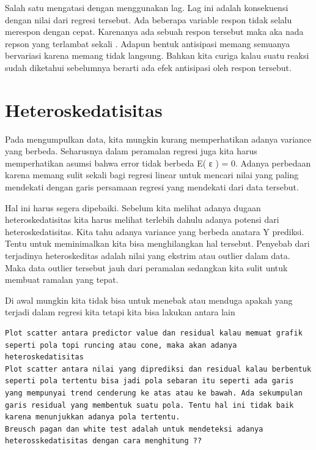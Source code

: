 \documentclass[
]{book}
\theoremstyle{definition}
\theoremstyle{definition}
\theoremstyle{definition}
\theoremstyle{definition}
\theoremstyle{remark}
\begin{document}
Salah satu mengatasi dengan menggunakan lag. Lag ini adalah konsekuensi dengan nilai dari regresi tersebut. Ada beberapa variable respon tidak selalu merespon dengan cepat. Karenanya ada sebuah respon tersebut maka aka nada repson yang terlambat sekali . Adapun bentuk antisipasi memang semuanya bervariasi karena memang tidak langsung. Bahkan kita curiga kalau suatu reaksi sudah diketahui sebelumnya berarti ada efek antisipasi oleh respon tersebut.

\hypertarget{heteroskedatisitas}{%
\section{Heteroskedatisitas}\label{heteroskedatisitas}}

Pada mengumpulkan data, kita mungkin kurang memperhatikan adanya variance yang berbeda. Seharusnya dalam peramalan regresi juga kita harus memperhatikan asumsi bahwa error tidak berbeda E( ε ) = 0. Adanya perbedaan karena memang sulit sekali bagi regresi linear untuk mencari nilai yang paling mendekati dengan garis persamaan regresi yang mendekati dari data tersebut.

Hal ini harus segera dipebaiki. Sebelum kita melihat adanya dugaan heteroskedatisitas kita harus melihat terlebih dahulu adanya potensi dari heteroskedatisitas. Kita tahu adanya variance yang berbeda anatara Y prediksi. Tentu untuk meminimalkan kita bisa menghilangkan hal tersebut. Penyebab dari terjadinya heteroskeditas adalah nilai yang ekstrim atau outlier dalam data. Maka data outlier tersebut jauh dari peramalan sedangkan kita sulit untuk membuat ramalan yang tepat.

Di awal mungkin kita tidak bisa untuk menebak atau menduga apakah yang terjadi dalam regresi kita tetapi kita bisa lakukan antara lain

\begin{verbatim}
Plot scatter antara predictor value dan residual kalau memuat grafik seperti pola topi runcing atau cone, maka akan adanya heteroskedatisitas 
Plot scatter antara nilai yang diprediksi dan residual kalau berbentuk seperti pola tertentu bisa jadi pola sebaran itu seperti ada garis yang mempunyai trend cenderung ke atas atau ke bawah. Ada sekumpulan garis residual yang membentuk suatu pola. Tentu hal ini tidak baik karena menunjukkan adanya pola tertentu. 
Breusch pagan dan white test adalah untuk mendeteksi adanya heterosskedatisitas dengan cara menghitung ??
\end{verbatim}
\end{document}
